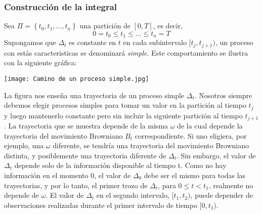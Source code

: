 \documentclass[11pt,notitlepage]{article}
\begin{document}
\subsubsection{Construcción de la integral}
Sea \(\Pi=\left \{ t_0,t_1,...,t_n \right \}\) una partición de \([0,T]\), es decir, \[0=t_0\leq t_1\leq ...\leq t_n=T\]
Supongamos que \(\Delta_{t}\) es constante en \(t\) en cada subintervalo \([t_j,t_{j+1})\), un proceso con estás caracteristicas se denominará \textit{simple}. Este comportamiento se ilustra con la siguiente gráfica: 
\begin{center}
 \texttt{[image: Camino de un proceso simple.jpg]}     
\end{center}
La figura nos enseña una trayectoria de un proceso simple \(\Delta_{t}\). Nosotros siempre debemos elegir procesos simples para tomar un valor en la partición al tiempo \(t_j\) y luego mantenerlo constante pero sin incluir la siguiente partición al tiempo
 \(t_{j+1}\). La trayectoria que se muestra depende de la misma \(\omega\) de la cual depende la trayectoria del movimiento Browniano \(B_t\) correspondiente. Si uno eligiera, por ejemplo, una \(\omega\) diferente, se tendría una trayectoria del movimiento Browniano distinta, y posiblemente una trayectoria diferente de \(\Delta_{t}\). Sin embargo, el valor de \(\Delta_{t}\) depende solo de la información disponible al tiempo t.
Como no hay información en el momento 0, el valor de \(\Delta_{0}\) debe ser el mismo para todas las trayectorias, y por lo tanto, el primer trozo de \(\Delta_{t}\), para \(0  \leq t < t_1\), realmente no depende de \(\omega\). El valor de \(\Delta_{t}\) en el segundo intervalo, \([t_1, t_2)\), puede depender de observaciones realizadas durante el primer intervalo de tiempo \([0, t_1)\).\\
\end{document}
